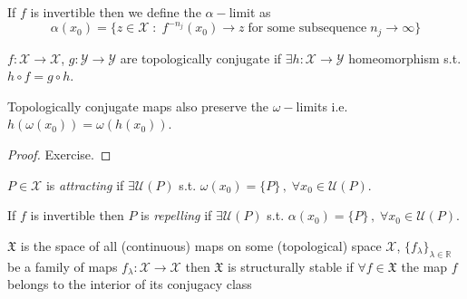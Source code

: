 \documentclass[../main.tex]{subfiles}
\begin{document}
\begin{observation}\label{obs5}
     If $f$ is invertible then we define the $\alpha-$limit as
     \begin{equation}\label{eq14}
             \alpha (x_{0}) = \{z\in \mathcal{X}\;:\;f^{-n_{j}}(x_{0})\to z \; \text{for some subsequence} \; n_{j}\to\infty\}
     \end{equation}
\end{observation}
\begin{definition}[]\label{def8}
     $f:\mathcal{X}\to \mathcal{X}$, $g:\mathcal{Y}\to \mathcal{Y}$ are topologically conjugate if $\exists h:\mathcal{X}\to  \mathcal{Y}$ homeomorphism s.t. $h \circ f = g \circ h$.
\end{definition}
\begin{remark*}\label{obs6}
     Topologically conjugate maps also preserve the $\omega-$limits i.e. $h(\omega(x_{0}))=\omega(h(x_{0}))$.
\end{remark*}
\begin{proof}
     Exercise.
\end{proof}
\begin{definition}\label{def9}
        $P\in \mathcal{X}$ is \textit{attracting} if $\exists \mathcal{U}(P)$ s.t. $\omega(x_{0})=\{P\}\,,\;\forall x_{0}\in \mathcal{U}(P)$.
\end{definition}
\begin{definition}\label{def10}
        If $f$ is invertible then  $P$ is \textit{repelling} if $\exists \mathcal{U}(P)$ s.t. $\alpha(x_{0})=\{P\}\,,\;\forall x_{0}\in \mathcal{U}(P)$.
\end{definition}
\begin{definition}[]\label{def11}
        $\mathfrak{X}$ is the space of all (continuous) maps on some (topological) space $\mathcal{X}$, $\{f_{\lambda}\}_{\lambda\in \mathbb{R}}$ be a family of maps $f_{\lambda}:\mathcal{X}\to \mathcal{X}$ then $\mathfrak{X}$ is structurally stable if $\forall f\in \mathfrak{X}$ the map $f$ belongs to the interior of its conjugacy class
\end{definition}
\end{document}
